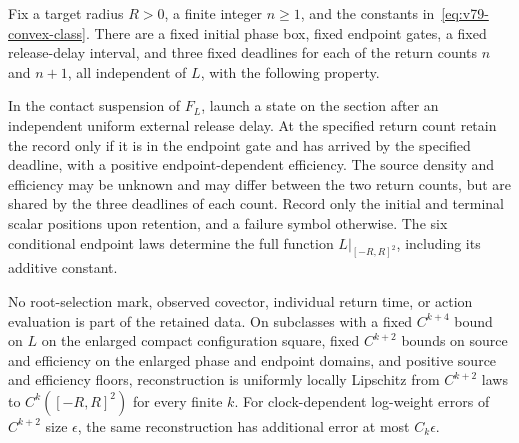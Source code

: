 \begin{theorem}
\label{thm:v79-six-clock}
Fix a target radius $R>0$, a finite integer $n\ge1$, and the constants
in~\eqref{eq:v79-convex-class}.  There are a fixed initial phase box,
fixed endpoint gates, a fixed release-delay interval, and three fixed
deadlines for each of the return counts $n$ and $n+1$, all independent
of $L$, with the following property.

In the contact suspension of $F_L$, launch a state on the section after
an independent uniform external release delay.  At the specified return
count retain the record only if it is in the endpoint gate and has
arrived by the specified deadline, with a positive endpoint-dependent
efficiency.  The source density and efficiency may be unknown and may
differ between the two return counts, but are shared by the three
deadlines of each count.  Record only the initial and terminal scalar
positions upon retention, and a failure symbol otherwise.  The six
conditional endpoint laws determine the full function
$L|_{[-R,R]^2}$, including its additive constant.

No root-selection mark, observed covector, individual return time,
or action evaluation is part of the retained data.  On subclasses with
a fixed $C^{k+4}$ bound on $L$ on the enlarged compact configuration
square, fixed $C^{k+2}$ bounds on source and efficiency on the enlarged
phase and endpoint domains, and positive source and efficiency floors,
reconstruction is uniformly locally Lipschitz from $C^{k+2}$ laws to
$C^k([-R,R]^2)$ for every finite $k$.  For clock-dependent log-weight
errors of $C^{k+2}$ size $\epsilon$, the same reconstruction has
additional error at most $C_k\epsilon$.
\end{theorem}
